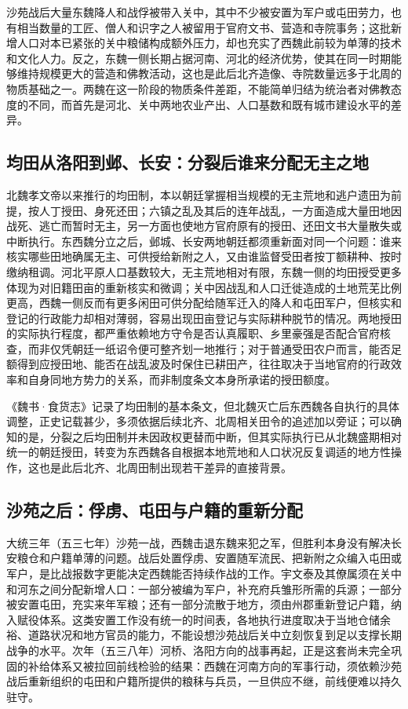 沙苑战后大量东魏降人和战俘被带入关中，其中不少被安置为军户或屯田劳力，也有相当数量的工匠、僧人和识字之人被留用于官府文书、营造和寺院事务；这批新增人口对本已紧张的关中粮储构成额外压力，却也充实了西魏此前较为单薄的技术和文化人力。反之，东魏一侧长期占据河南、河北的经济优势，使其在同一时期能够维持规模更大的营造和佛教活动，这也是此后北齐造像、寺院数量远多于北周的物质基础之一。两魏在这一阶段的物质条件差距，不能简单归结为统治者对佛教态度的不同，而首先是河北、关中两地农业产出、人口基数和既有城市建设水平的差异。

\subsection{均田从洛阳到邺、长安：分裂后谁来分配无主之地}

北魏孝文帝以来推行的均田制，本以朝廷掌握相当规模的无主荒地和逃户遗田为前提，按人丁授田、身死还田；六镇之乱及其后的连年战乱，一方面造成大量田地因战死、逃亡而暂时无主，另一方面也使地方官府原有的授田、还田文书大量散失或中断执行。东西魏分立之后，邺城、长安两地朝廷都须重新面对同一个问题：谁来核实哪些田地确属无主、可供授给新附之人，又由谁监督受田者按丁额耕种、按时缴纳租调。河北平原人口基数较大，无主荒地相对有限，东魏一侧的均田授受更多体现为对旧籍田亩的重新核实和微调；关中因战乱和人口迁徙造成的土地荒芜比例更高，西魏一侧反而有更多闲田可供分配给随军迁入的降人和屯田军户，但核实和登记的行政能力却相对薄弱，容易出现田亩登记与实际耕种脱节的情况。两地授田的实际执行程度，都严重依赖地方守令是否认真履职、乡里豪强是否配合官府核查，而非仅凭朝廷一纸诏令便可整齐划一地推行；对于普通受田农户而言，能否足额得到应授田地、能否在战乱波及时保住已耕田产，往往取决于当地官府的行政效率和自身同地方势力的关系，而非制度条文本身所承诺的授田额度。

《魏书·食货志》记录了均田制的基本条文，但北魏灭亡后东西魏各自执行的具体调整，正史记载甚少，多须依据后续北齐、北周相关田令的追述加以旁证；可以确知的是，分裂之后均田制并未因政权更替而中断，但其实际执行已从北魏盛期相对统一的朝廷授田，转变为东西魏各自根据本地荒地和人口状况反复调适的地方性操作，这也是此后北齐、北周田制出现若干差异的直接背景。

\subsection{沙苑之后：俘虏、屯田与户籍的重新分配}

大统三年（五三七年）沙苑一战，西魏击退东魏来犯之军，但胜利本身没有解决长安粮仓和户籍单薄的问题。战后处置俘虏、安置随军流民、把新附之众编入屯田或军户，是比战报数字更能决定西魏能否持续作战的工作。宇文泰及其僚属须在关中和河东之间分配新增人口：一部分被编为军户，补充府兵雏形所需的兵源；一部分被安置屯田，充实来年军粮；还有一部分流散于地方，须由州郡重新登记户籍，纳入赋役体系。这类安置工作没有统一的时间表，各地执行进度取决于当地仓储余裕、道路状况和地方官员的能力，不能设想沙苑战后关中立刻恢复到足以支撑长期战争的水平。次年（五三八年）河桥、洛阳方向的战事再起，正是这套尚未完全巩固的补给体系又被拉回前线检验的结果：西魏在河南方向的军事行动，须依赖沙苑战后重新组织的屯田和户籍所提供的粮秣与兵员，一旦供应不继，前线便难以持久驻守。

